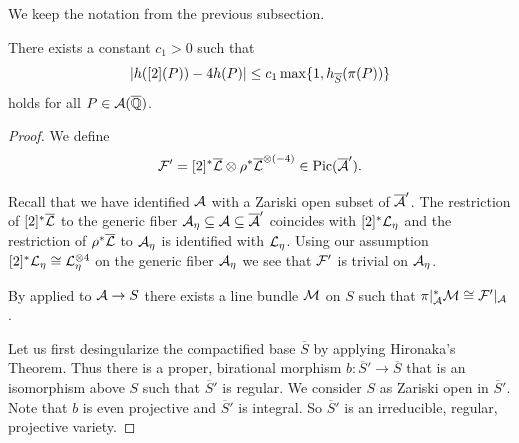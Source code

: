 We keep the notation from the  previous subsection.


\begin{proposition}
  There exists a constant $c_1>0$ such that 
  \begin{equation}
    \label{eq:duplicationbound}
\left|   h([2](P)) - 4
   h(P)\right|  \le c_1  \max\{1,h_{\overline
   S}(\pi(P))\}
  \end{equation}
  holds for all $P\in \mathcal{A}({\overline{\mathbb{Q}}})$. 
\end{proposition}
\begin{proof}
  We define
  \begin{equation}
  \label{def:cF2}
  {\mathcal F}' =  [2]^* \overline{{\mathcal L}} \otimes
  \rho^*\overline{{\mathcal L}}^{\otimes(-4)} \in \mathrm{Pic}(\overline{\mathcal{A}}'). 
\end{equation}
  
Recall that we have identified $\mathcal{A}$ with a Zariski open subset of
$\overline{\mathcal{A}}'$. 
The  restriction of $[2]^*\overline{{\mathcal L}}$ to the generic fiber
$\mathcal{A}_\eta\subseteq\mathcal{A}\subseteq\overline{\mathcal{A}}'$
coincides with $[2]^*{\mathcal L}_\eta$ and the restriction of $\rho^*\overline{{\mathcal L}}$  to $\mathcal{A}_\eta$
is identified with ${\mathcal L}_\eta$. Using our assumption
 $[2]^*{\mathcal L}_\eta \cong
{\mathcal L}_\eta^{\otimes 4}$ on the generic fiber $\mathcal{A}_\eta$ we see that  ${\mathcal F}'$ is trivial on $\mathcal{A}_\eta$.

By \cite[Corollaire~21.4.13 (pp.~361 of EGA IV-4, in Errata et Addenda, liste~3)]{EGAIV} %
applied to
$\mathcal{A}\rightarrow S$ there exists a line
bundle ${\mathcal M}$ on $S$ such that $\pi|_{\mathcal{A}}^*{\mathcal M} \cong {\mathcal F}'|_{\mathcal{A}}$.

Let us first desingularize the compactified base $\overline S$ by applying
Hironaka's Theorem. Thus there is a proper, birational morphism
$b\colon \overline S'\rightarrow\overline S$ that is an isomorphism
above $S$
 such that  $\overline S'$
is regular. We consider $S$ as Zariski open in $\overline S'$.  Note that $b$ is even
projective and $\overline S'$ is integral. So $\overline S'$ is an
irreducible, regular, projective variety. 


\end{proof}
